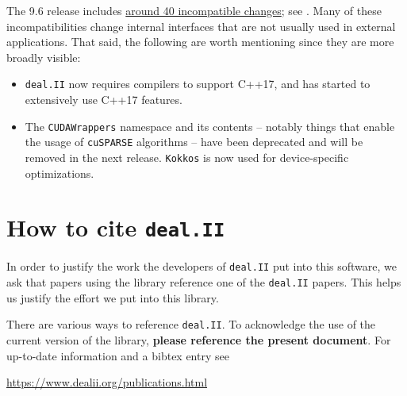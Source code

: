 \documentclass{ansarticle-preprint}
\newcommand{\specialword}[1]{\texttt{#1}}
\newcommand{\dealii}{{\specialword{deal.II}}\xspace}
\newcommand{\kokkos}{{\specialword{Kokkos}}\xspace}
\begin{document}
The 9.6 release includes
\href{https://dealii.org/developer/doxygen/deal.II/changes_between_9_5_2_and_9_6_0.html}
     {around 40 incompatible changes};
see \cite{changes96}. Many of these
incompatibilities change internal
interfaces that are not usually used in external
applications. That said, the following are worth mentioning since they
are more broadly visible:
\begin{itemize}
  \item \dealii{} now requires compilers to support C++17, and has
    started to extensively use C++17 features.
  \item The \texttt{CUDAWrappers} namespace and its contents --
    notably things that enable the usage of \texttt{cuSPARSE} algorithms --
    have been deprecated and will be removed in the next
    release. \kokkos{} is now used for device-specific optimizations.
\end{itemize}



\section{How to cite \dealii}\label{sec:cite}

In order to justify the work the developers of \dealii put into this
software, we ask that papers using the library reference one of the
\dealii papers. This helps us justify the effort we put into this library.

There are various ways to reference \dealii. To acknowledge the use of
the current version of the library, \textbf{please reference the present
  document}. For up-to-date information and a bibtex entry
see
\begin{center}
  \url{https://www.dealii.org/publications.html}
\end{center}
\end{document}

